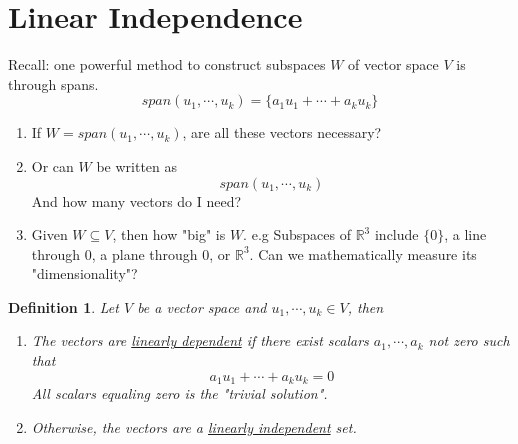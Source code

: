 \documentclass{article}
\newtheorem{definition}[theorem]{Definition}
\newtheorem{one minute paper}[theorem]{One Minute Paper}
\begin{document}
\section*{Linear Independence}

Recall: one powerful method to construct subspaces $W$ of vector space $V$ is through spans. 
\begin{equation}
    span(u_1, \cdots, u_k) = \{a_1u_1 + \cdots + a_ku_k\}
\end{equation}

\begin{enumerate}
    \item If $W = span(u_1, \cdots, u_k)$, are all these vectors necessary?  
    \item Or can $W$ be written as 
    \begin{equation}
        span(u_1, \cdots, u_k)
    \end{equation} 
    And how many vectors do I need?
    \item Given $W \subseteq V$, then how "big" is $W$. e.g Subspaces of $\mathbb{R}^3$ include $\{0\}$, a line through 0, a plane through 0, or $\mathbb{R}^3$. Can we mathematically measure its "dimensionality"?
\end{enumerate}

\begin{definition}
    Let $V$ be a vector space and $u_1, \cdots, u_k \in V$, then 
    \begin{enumerate}
        \item The vectors are \underline{linearly dependent} if there exist scalars $a_1, \cdots, a_k$ not zero such that 
        \begin{equation}
            a_1u_1 + \cdots + a_ku_k = 0    
        \end{equation}
        All scalars equaling zero is the "trivial solution". 
        \item Otherwise, the vectors are a \underline{linearly independent} set. 
    \end{enumerate}
\end{definition}
\end{document}

